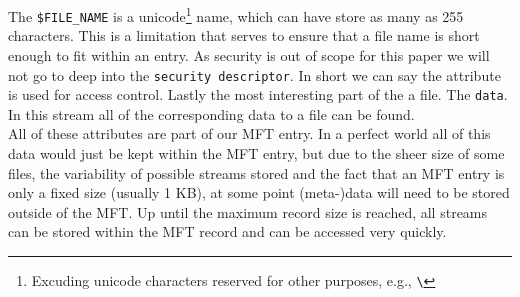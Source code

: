 The \texttt{\$FILE\_NAME} is a unicode\footnote{Excuding unicode characters reserved for other purposes, e.g., \texttt{\textbackslash}} name, which can have store as many as 255 characters.\cite{microsoftinc:2018:MFP} This is a limitation that serves to ensure that a  file name is  short enough to fit within an entry.
As security is out of scope for this paper we will not go to deep into the \texttt{security descriptor}. In short we can say  the attribute is used for access control.
Lastly the most interesting part of the a file. The \texttt{data}. In this stream all of the corresponding data to a file can be found.\\
All of these attributes are part of our MFT entry. In a perfect world all of this data would just be kept within the MFT entry, but due to the sheer size of some files, the variability of possible streams stored and the fact that an MFT entry is only a fixed size (usually 1 KB\cite{B:2017:AJI}), at some point (meta-)data will need to be stored outside of the MFT. Up until the maximum record size is reached, all streams can be stored within the MFT record and can  be accessed very quickly.
